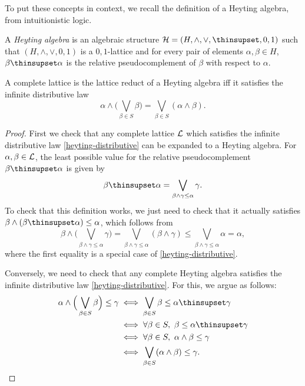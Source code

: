 \begin{appendices}
To put these concepts in context, we recall the definition of a Heyting algebra, from intuitionistic logic.

\begin{defn} A \emph{Heyting algebra} is an algebraic structure $\cH = (H, \wedge, \vee, \thinsupset, 0, 1)$ such that $(H, \wedge, \vee, 0, 1)$ is a $0,1$-lattice and for every pair of elements $\alpha, \beta \in H$, $\beta \thinsupset \alpha$ is the relative pseudocomplement of $\beta$ with respect to $\alpha$.
\end{defn}

\begin{prop} A complete lattice is the lattice reduct of a Heyting algebra iff it satisfies the infinite distributive law
\begin{equation}
\alpha \wedge \Big(\bigvee_{\beta \in S} \beta\Big) = \bigvee_{\beta \in S} (\alpha \wedge \beta).\label{heyting-distributive}\tag{D$_\infty$($\wedge$)}
\end{equation}
\end{prop}
\begin{proof} First we check that any complete lattice $\mathcal{L}$ which satisfies the infinite distributive law \eqref{heyting-distributive} can be expanded to a Heyting algebra. For $\alpha, \beta \in \mathcal{L}$, the least possible value for the relative pseudocomplement $\beta \thinsupset \alpha$ is given by
\[
\beta \thinsupset \alpha = \bigvee_{\beta \wedge \gamma \le \alpha} \gamma.
\]
To check that this definition works, we just need to check that it actually satisfies $\beta \wedge (\beta \thinsupset \alpha) \le \alpha$, which follows from
\[
\beta \wedge \Big(\bigvee_{\beta \wedge \gamma \le \alpha} \gamma\Big) = \bigvee_{\beta \wedge \gamma \le \alpha} (\beta \wedge \gamma) \le \bigvee_{\beta \wedge \gamma \le \alpha} \alpha = \alpha,
\]
where the first equality is a special case of \eqref{heyting-distributive}.

Conversely, we need to check that any complete Heyting algebra satisfies the infinite distributive law \eqref{heyting-distributive}. For this, we argue as follows:
\begin{align*}
\alpha \wedge \Big(\bigvee_{\beta \in S} \beta\Big) \le \gamma &\iff \bigvee_{\beta \in S} \beta \le \alpha \thinsupset \gamma\\
&\iff \forall \beta \in S,\ \beta \le \alpha \thinsupset \gamma\\
&\iff \forall \beta \in S,\ \alpha \wedge \beta \le \gamma\\
&\iff \bigvee_{\beta \in S} (\alpha \wedge \beta) \le \gamma.\qedhere
\end{align*}
\end{proof}


\end{appendices}
